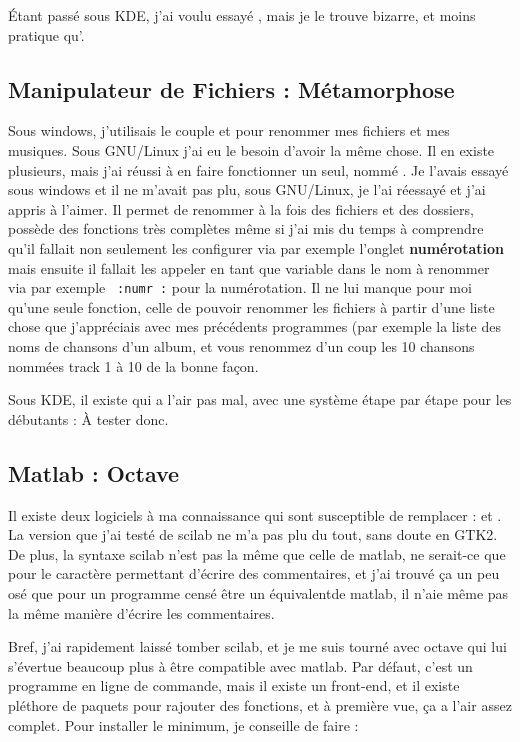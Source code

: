 \documentclass[a4paper,twoside]{article}
\begin{document}
Étant passé sous KDE, j'ai voulu essayé , mais je le trouve bizarre, et moins pratique qu'.

\subsection{Manipulateur de Fichiers : Métamorphose}
Sous windows, j'utilisais le couple  et  pour renommer mes fichiers et mes musiques. Sous GNU/Linux j'ai eu le besoin d'avoir la même chose. Il en existe plusieurs, mais j'ai réussi à en faire fonctionner un seul, nommé . Je l'avais essayé sous windows et il ne m'avait pas plu, sous GNU/Linux, je l'ai réessayé et j'ai appris à l'aimer. Il permet de renommer à la fois des fichiers et des dossiers, possède des fonctions très complètes même si j'ai mis du temps à comprendre qu'il fallait non seulement les configurer via par exemple l'onglet \textbf{numérotation} mais ensuite il fallait les appeler en tant que variable dans le nom à renommer via par exemple \verb| :numr :| pour la numérotation. Il ne lui manque pour moi qu'une seule fonction, celle de pouvoir renommer les fichiers à partir d'une liste chose que j'appréciais avec mes précédents programmes (par exemple la liste des noms de chansons d'un album, et vous renommez d'un coup les 10 chansons nommées track 1 à 10 de la bonne façon.

Sous KDE, il existe  qui a l'air pas mal, avec une système étape par étape pour les débutants : À tester donc.

\subsection{Matlab : Octave}\label{sec:matlab}
Il existe deux logiciels à ma connaissance qui sont susceptible de remplacer  :  et . La version que j'ai testé de scilab ne m'a pas plu du tout, sans doute en GTK2. De plus, la syntaxe scilab n'est pas la même que celle de matlab, ne serait-ce que pour le caractère permettant d'écrire des commentaires, et j'ai trouvé ça un peu osé que pour un programme censé être un \og équivalent\fg de matlab, il n'aie même pas la même manière d'écrire les commentaires.

Bref, j'ai rapidement laissé tomber scilab, et je me suis tourné avec octave qui lui s'évertue beaucoup plus à être compatible avec matlab. Par défaut, c'est un programme en ligne de commande, mais il existe un front-end, et il existe pléthore de paquets pour rajouter des fonctions, et à première vue, ça a l'air assez complet. Pour installer le minimum, je conseille de faire :
\end{document}
